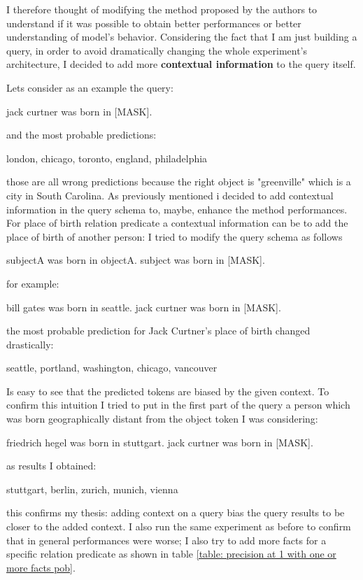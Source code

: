 \documentclass{article}
\begin{document}
I therefore thought of modifying the method proposed by the authors to understand if it was possible to obtain better performances or better understanding of model's behavior. Considering the fact that I am just building a query, in order to avoid dramatically changing the whole experiment's architecture, I decided to add more \textbf{contextual information} to the query itself.

Lets consider as an example the query:
\begin{center}
jack curtner was born in [MASK].
\end{center}
and the most probable predictions:
\begin{center}
london, chicago, toronto, england, philadelphia
\end{center}
those are all wrong predictions because the right object is "greenville" which is a city in South Carolina.
As previously mentioned i decided to add contextual information in the query schema to, maybe, enhance the method performances. For place of birth relation predicate a contextual information can be to add the place of birth of another person: I tried to modify the query schema as follows
\begin{center}
subjectA was born in objectA. subject was born in [MASK].
\end{center}
for example:
\begin{center}
bill gates was born in seattle. jack curtner was born in [MASK].
\end{center}
the most probable prediction for Jack Curtner's place of birth changed drastically:
\begin{center}
seattle, portland, washington, chicago, vancouver
\end{center}
Is easy to see that the predicted tokens are biased by the given context. To confirm this intuition I tried to put in the first part of the query a person which was born geographically distant from the object token I was considering:
\begin{center}
friedrich hegel was born in stuttgart. jack curtner was born in [MASK].
\end{center}
as results I obtained:
\begin{center}
stuttgart, berlin, zurich, munich, vienna
\end{center}
this confirms my thesis: adding context on a query bias the query results to be closer to the added context. I also run the same experiment as before to confirm that in general performances were worse; I also try to add more facts for a specific relation predicate as shown in table \ref{table: precision at 1 with one or more facts pob}.
\end{document}
